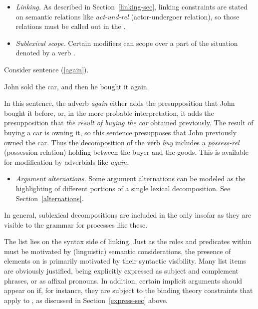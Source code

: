 \documentclass[output=paper
 	        ,biblatex
                ,babelshorthands
                ,newtxmath
                ,draftmode
                ,colorlinks, citecolor=brown
]{langscibook}
\begin{document}
\begin{itemize}
\item  \textit{Linking.}  As described in Section~\ref{linking-sec}, linking constraints are stated on semantic relations like \textit{act-und-rel} (actor-undergoer relation), so those relations must be called out in the \content {}.
\item \textit{Sublexical scope.}  Certain modifiers can scope over a part of the situation denoted by a verb \citep{Dowty:1979a}.  
\end{itemize}

Consider sentence (\ref{again}).

\begin{exe}
\ex \label{again} John sold the car, and then he bought it again.
\end{exe}

\noindent
In this sentence, the adverb \textit{again} either adds the presupposition that John bought it before, or, in the more probable interpretation, it adds the presupposition that \textit{the result of buying the car} obtained previously.  The result of buying a car is owning it, so this sentence presupposes that John previously owned the car. Thus the decomposition of the verb \textit{buy} includes a \textit{possess-rel} (possession relation) holding between the buyer and the goods.  This is available for modification by adverbials like \textit{again}.

\begin{itemize}
\item \textit{Argument alternations.}  Some argument alternations can be modeled as the highlighting of different portions of a single lexical decomposition.  See Section~\ref{alternations}.
\end{itemize}  

\noindent
In general, sublexical decompositions are included in the \content {} only insofar as they are visible to the grammar for processes like these.  

The \argst list lies on the syntax side of linking.  Just as the roles and predicates within \content must be motivated by (linguistic) semantic considerations, the presence of elements on \argst is primarily motivated by their syntactic visibility.  Many \argst list items are obviously justified, being explicitly expressed as subject and complement phrases, or as affixal pronouns.  In addition, certain implicit arguments should appear on \argst if, for instance, they are subject to the binding theory constraints that apply to \argst, as discussed in Section~\ref{express-sec} above.
\end{document}
